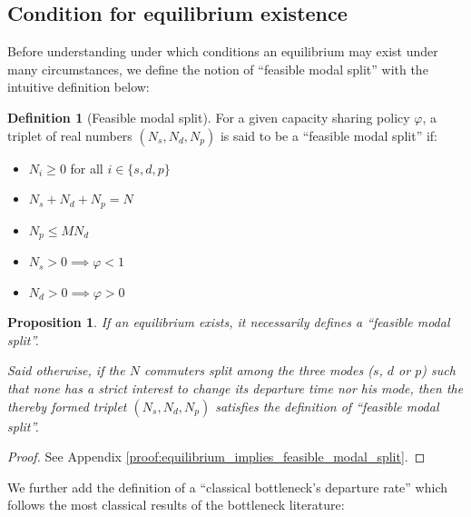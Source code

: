 \documentclass[english, a4paper]{article}
\theoremstyle{plain}
\newtheorem{proposition}{Proposition}
\theoremstyle{definition}
\newtheorem{definition}{Definition}
\theoremstyle{remark}
\begin{document}
\subsection{Condition for equilibrium existence}

Before understanding under which conditions an equilibrium may exist under many circumstances, we define the notion of ``feasible modal split'' with the intuitive definition below:

\begin{definition}[Feasible modal split]
    For a given capacity sharing policy $\varphi$, a triplet of real numbers $(N_s, N_d, N_p)$ is said to be a ``feasible modal split'' if:
    \begin{itemize}
        \item $N_i \geq 0$ for all $i\in \{s, d, p\}$
        \item $N_s + N_d + N_p = N$
        \item $N_p \leq MN_d$
        \item $N_s > 0 \implies \varphi < 1$
        \item $N_d > 0 \implies \varphi > 0$
    \end{itemize}
\end{definition}

\begin{proposition}
    \label{proposition:equilibrium_implies_feasible_modal_split}
    If an equilibrium exists, it necessarily defines a ``feasible modal split''.
    
    Said otherwise, if the $N$ commuters split among the three modes ($s$, $d$ or $p$) such that none has a strict interest to change its departure time nor his mode, then the thereby formed triplet $(N_s, N_d, N_p)$ satisfies the definition of ``feasible modal split''.
\end{proposition}

\begin{proof}
    See Appendix \ref{proof:equilibrium_implies_feasible_modal_split}.
\end{proof}

We further add the definition of a ``classical bottleneck’s departure rate'' which follows the most classical results of the bottleneck literature:
\end{document}
